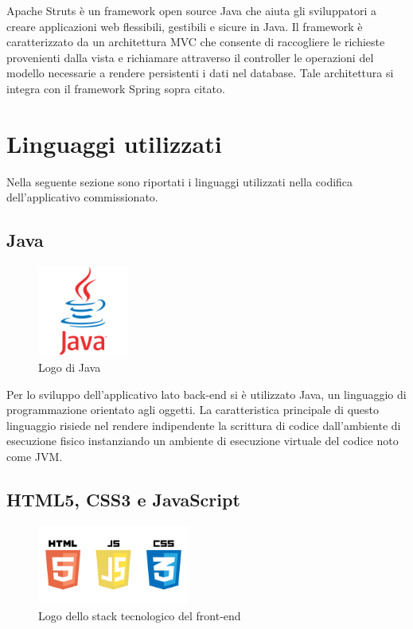 \noindent Apache Struts è un framework open source Java che aiuta gli sviluppatori a creare applicazioni web flessibili, gestibili e sicure in Java. Il framework è caratterizzato da un architettura MVC che consente di raccogliere le richieste provenienti dalla vista e richiamare attraverso il controller le operazioni del modello necessarie a rendere persistenti i dati nel database. Tale architettura si integra con il framework Spring sopra citato.

\pagebreak

\section{Linguaggi utilizzati}
Nella seguente sezione sono riportati i linguaggi utilizzati nella codifica dell'applicativo commissionato.

\subsection{Java}

\begin{figure}[!h]
	\centering
	\includegraphics[width=3cm]{../images/Java-logo.png}
	\caption{Logo di Java}
\end{figure}

\noindent Per lo sviluppo dell'applicativo lato back-end si è utilizzato Java, un linguaggio di programmazione orientato agli oggetti. La caratteristica principale di questo linguaggio risiede nel rendere indipendente la scrittura di codice dall'ambiente di esecuzione fisico instanziando un ambiente di esecuzione virtuale del codice noto come JVM.

\subsection{HTML5, CSS3 e JavaScript}

\begin{figure}[!h]
	\centering
	\includegraphics[width=5cm]{../images/HTML5-logo.png}
	\caption{Logo dello stack tecnologico del front-end}
\end{figure}


